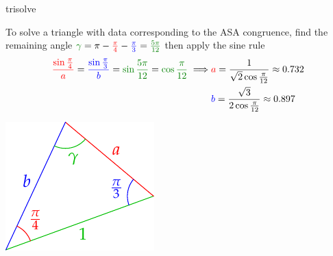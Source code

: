 \begin{examples}{}{trisolve}
\begin{enumerate}
\begin{minipage}[t]{0.13\linewidth}
\end{minipage}\smallbreak
\begin{minipage}[t]{0.75\linewidth}\vspace{0pt}
	\item\label{ex:trisolve2} To solve a triangle with data corresponding to the ASA congruence, find the remaining angle $\textcolor{Green}{\gamma}=\pi-\textcolor{red}{\frac\pi 4}-\textcolor{blue}{\frac\pi 3} =\textcolor{Green}{\frac{5\pi}{12}}$ then apply the sine rule
  \begin{align*}
  \textcolor{red}{\frac{\sin\frac\pi 4}a} =\textcolor{blue}{\frac{\sin\frac\pi 3}b} =\textcolor{Green}{\sin\frac{5\pi}{12}}=\textcolor{Green}{\cos\frac{\pi}{12}} \implies &\textcolor{red}{a}=\frac 1{\sqrt 2\cos\frac{\pi}{12}}\approx 0.732\\
  &\textcolor{blue}{b}=\frac{\sqrt 3}{2\cos\frac{\pi}{12}}\approx 0.897
  \end{align*}
\end{minipage}\hfill\begin{minipage}[t]{0.24\linewidth}\vspace{0pt}
	\flushright\includegraphics[scale=0.95]{angles-asasolve}
\end{minipage}
\end{enumerate}
\end{examples}


\goodbreak




